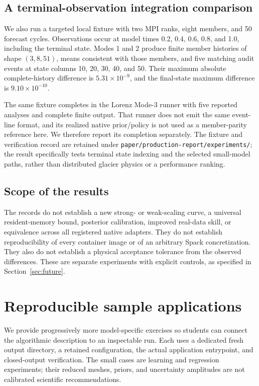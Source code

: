 \documentclass[11pt,a4paper]{article}
\newcommand{\code}[1]{\nolinkurl{#1}}
\begin{document}
\subsection{A terminal-observation integration comparison}
We also run a targeted local fixture with two MPI ranks, eight members, and 50 forecast cycles. Observations occur at model times 0.2, 0.4, 0.6, 0.8, and 1.0, including the terminal state. Modes 1 and 2 produce finite member histories of shape \((3,8,51)\), means consistent with those members, and five matching audit events at state columns 10, 20, 30, 40, and 50. Their maximum absolute complete-history difference is \(5.31\times10^{-9}\), and the final-state maximum difference is \(9.10\times10^{-10}\).

The same fixture completes in the Lorenz Mode-3 runner with five reported analyses and complete finite output. That runner does not emit the same event-line format, and its realized native prior/policy is not used as a member-parity reference here. We therefore report its completion separately. The fixture and verification record are retained under \code{paper/production-report/experiments/}; the result specifically tests terminal state indexing and the selected small-model paths, rather than distributed glacier physics or a performance ranking.

\subsection{Scope of the results}
The records do not establish a new strong- or weak-scaling curve, a universal resident-memory bound, posterior calibration, improved real-data skill, or equivalence across all registered native adapters. They do not establish reproducibility of every container image or of an arbitrary Spack concretization. They also do not establish a physical acceptance tolerance from the observed differences. These are separate experiments with explicit controls, as specified in Section~\ref{sec:future}.

\section{Reproducible sample applications}\label{sec:samples}
We provide progressively more model-specific exercises so students can connect the algorithmic description to an inspectable run. Each uses a dedicated fresh output directory, a retained configuration, the actual application entrypoint, and closed-output verification. The small cases are learning and regression experiments; their reduced meshes, priors, and uncertainty amplitudes are not calibrated scientific recommendations.
\end{document}
